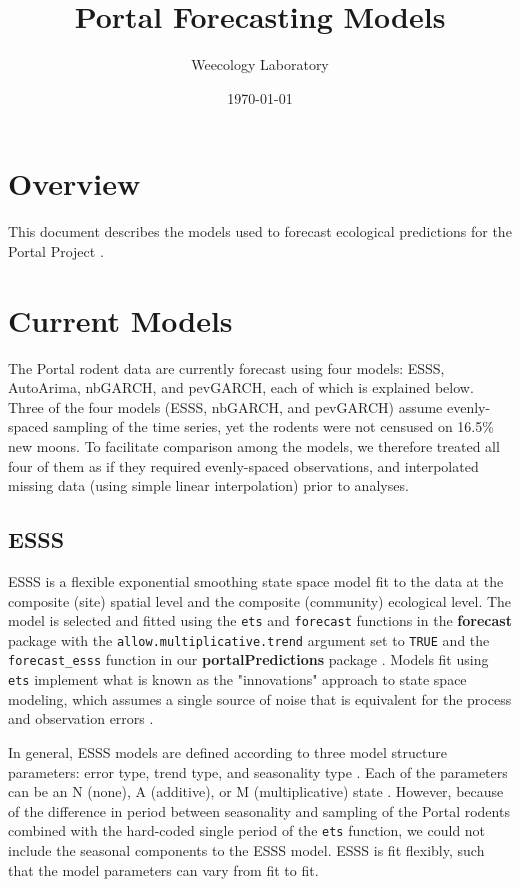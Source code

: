 \documentclass{article}
\title{Portal Forecasting Models}
\author[1]{Weecology Laboratory}
\affil[1]{University of Florida}
\date{\today}
\def\code#1{\texttt{#1}}
\begin{document}
\maketitle
\tableofcontents

\section*{Overview}
\label{sec:overview}

This document describes the models used to forecast ecological predictions for the Portal Project \citep{Brown1998, PortalPredictions}. 

\section{Current Models}
\label{sec:currmods}

The Portal rodent data are currently forecast using four models: ESSS, AutoArima, nbGARCH, and pevGARCH, each of which is explained below. Three of the four models (ESSS, nbGARCH, and pevGARCH) assume evenly-spaced sampling of the time series, yet the rodents were not censused on 16.5\% new moons. To facilitate comparison among the models, we therefore treated all four of them as if they required evenly-spaced observations, and interpolated missing data (using simple linear interpolation) prior to analyses. 

\subsection{ESSS}
\label{subsec:currmods_esss}

ESSS is a flexible exponential smoothing state space model \citep{Hyndman2008} fit to the data at the composite (site) spatial level and the composite (community) ecological level. The model is selected and fitted using the \code{ets} and \code{forecast} functions in the \textbf{forecast} package \citep{Hyndman2017} with the \code{allow.multiplicative.trend} argument set to \code{TRUE} and the \code{forecast\_esss} function in our \textbf{portalPredictions} package \citep{PortalPredictions}. Models fit using \code{ets} implement what is known as the "innovations" approach to state space modeling, which assumes a single source of noise that is equivalent for the process and observation errors \citep{Hyndman2008}.

In general, ESSS models are defined according to three model structure parameters: error type, trend type, and seasonality type \citep{Hyndman2008}. Each of the parameters can be an N (none), A (additive), or M (multiplicative) state \citep{Hyndman2008}. However, because of the difference in period between seasonality and sampling of the Portal rodents combined with the hard-coded single period of the \code{ets} function, we could not include the seasonal components to the ESSS model. ESSS is fit flexibly, such that the model parameters can vary from fit to fit.
\end{document}

